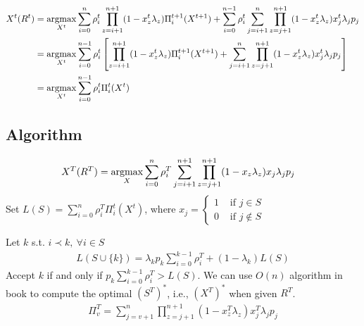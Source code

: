 \documentclass[11pt,a4paper]{article}
\newcommand{\argmax}{\operatornamewithlimits{argmax}}
\begin{document}
\begin{equation}
    \begin{aligned}
        X^t(R^t)&=\argmax_{X^t} \sum_{i=0}^{n} \rho_i^t\prod_{z=i+1}^{n+1}(1-x^t_z\lambda_{z}) \Pi_i^{t+1}(X^{t+1})+\sum_{i=0}^{n-1}\rho_i^t\sum_{j=i+1}^{n}\prod_{z=j+1}^{n+1}(1-x_z^t\lambda_{z})x_j^t\lambda_{j}p_j\\
        &=\argmax_{X^t} \sum_{i=0}^{n-1} \rho_i^t\left[\prod_{z=i+1}^{n+1}(1-x^t_z\lambda_{z}) \Pi_i^{t+1}(X^{t+1})+\sum_{j=i+1}^{n}\prod_{z=j+1}^{n+1}(1-x_z^t\lambda_{z})x_j^t\lambda_{j}p_j\right]\\
        &=\argmax_{X^t} \sum_{i=0}^{n-1} \rho_i^t\Pi_i^t(X^t)
    \end{aligned}
    \nonumber
\end{equation}











\subsection{Algorithm}
\begin{equation}
    \begin{aligned}
        X^T(R^T)&=\argmax_{X} \sum_{i=0}^{n} \rho_i^T\sum_{j=i+1}^{n+1}\prod_{z=j+1}^{n+1}(1-x_z\lambda_{z})x_j\lambda_{j}p_j
    \end{aligned}
    \nonumber
\end{equation}
Set $L(S)=\sum_{i=0}^{n} \rho_i^T\Pi_i^t(X^t)$, where $x_j=\left\{\begin{matrix}
    1&\text{ if }j\in S\\
    0&\text{ if }j\notin S
\end{matrix}\right.$

Let $k$ s.t. $i\prec k,\ \forall i\in S$
\begin{equation}
    \begin{aligned}
        L(S\cup\{k\})=\lambda_kp_k\sum_{i=0}^{k-1} \rho_i^T+(1-\lambda_k)L(S)
    \end{aligned}
    \nonumber
\end{equation}
Accept $k$ if and only if $p_k\sum_{i=0}^{k-1} \rho_i^T>L(S)$. We can use $O(n)$ algorithm in book to compute the optimal $(S^T)^*$, i.e., $(X^T)^*$ when given $R^T$.
\begin{equation}
    \begin{aligned}
        \Pi_v^T=\sum_{j=v+1}^{n}\prod_{z=j+1}^{n+1}(1-x^T_z\lambda_{z})x^T_j\lambda_{j}p_j
    \end{aligned}
    \nonumber
\end{equation}
\end{document}
